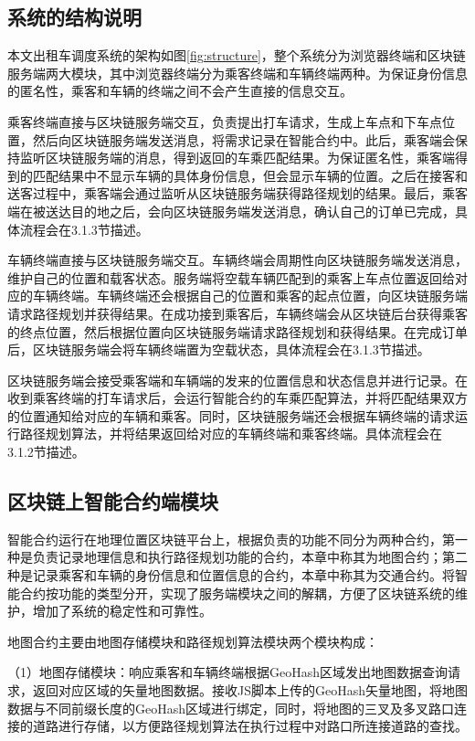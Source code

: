 \subsection{系统的结构说明}
本文出租车调度系统的架构如图\ref{fig:structure}，整个系统分为浏览器终端和区块链服务端两大模块，其中浏览器终端分为乘客终端和车辆终端两种。为保证身份信息的匿名性，乘客和车辆的终端之间不会产生直接的信息交互。

乘客终端直接与区块链服务端交互，负责提出打车请求，生成上车点和下车点位置，然后向区块链服务端发送消息，将需求记录在智能合约中。此后，乘客端会保持监听区块链服务端的消息，得到返回的车乘匹配结果。为保证匿名性，乘客端得到的匹配结果中不显示车辆的具体身份信息，但会显示车辆的位置。之后在接客和送客过程中，乘客端会通过监听从区块链服务端获得路径规划的结果。最后，乘客端在被送达目的地之后，会向区块链服务端发送消息，确认自己的订单已完成，具体流程会在3.1.3节描述。

车辆终端直接与区块链服务端交互。车辆终端会周期性向区块链服务端发送消息，维护自己的位置和载客状态。服务端将空载车辆匹配到的乘客上车点位置返回给对应的车辆终端。车辆终端还会根据自己的位置和乘客的起点位置，向区块链服务端请求路径规划并获得结果。在成功接到乘客后，车辆终端会从区块链后台获得乘客的终点位置，然后根据位置向区块链服务端请求路径规划和获得结果。在完成订单后，区块链服务端会将车辆终端置为空载状态，具体流程会在3.1.3节描述。

区块链服务端会接受乘客端和车辆端的发来的位置信息和状态信息并进行记录。在收到乘客终端的打车请求后，会运行智能合约的车乘匹配算法，并将匹配结果双方的位置通知给对应的车辆和乘客。同时，区块链服务端还会根据车辆终端的请求运行路径规划算法，并将结果返回给对应的车辆终端和乘客终端。具体流程会在3.1.2节描述。

\subsection{区块链上智能合约端模块}
智能合约运行在地理位置区块链平台上，根据负责的功能不同分为两种合约，第一种是负责记录地理信息和执行路径规划功能的合约，本章中称其为地图合约；第二种是记录乘客和车辆的身份信息和位置信息的合约，本章中称其为交通合约。将智能合约按功能的类型分开，实现了服务端模块之间的解耦，方便了区块链系统的维护，增加了系统的稳定性和可靠性。

地图合约主要由地图存储模块和路径规划算法模块两个模块构成：

（1）地图存储模块：响应乘客和车辆终端根据GeoHash区域发出地图数据查询请求，返回对应区域的矢量地图数据。接收JS脚本上传的GeoHash矢量地图，将地图数据与不同前缀长度的GeoHash区域进行绑定，同时，将地图的三叉及多叉路口连接的道路进行存储，以方便路径规划算法在执行过程中对路口所连接道路的查找。


